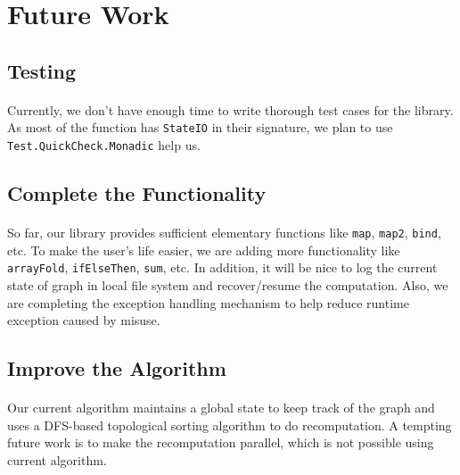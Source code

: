 \documentclass[a4paper, twocolumn]{article}
\newcommand{\code}{\texttt} %
\begin{document}
\section{Future Work}
\subsection{Testing}
\paragraph{} Currently, we don't have enough time to write thorough test cases for the library. As most of the function has \code{StateIO} in their signature, we plan to use \code{Test.QuickCheck.Monadic} help us.  

\subsection{Complete the Functionality}
\paragraph{} So far, our library provides sufficient elementary functions like \code{map}, \code{map2}, \code{bind}, etc. To make the user's life easier, we are adding more functionality like \code{arrayFold}, \code{ifElseThen}, \code{sum}, etc. In addition, it will be nice to log the current state of graph in local file system and recover/resume the computation. Also, we are completing the exception handling mechanism to help reduce runtime exception caused by misuse. 

\subsection{Improve the Algorithm}
\paragraph{} Our current algorithm maintains a global state to keep track of the graph and uses a DFS-based topological sorting algorithm to do recomputation. A tempting future work is to make the recomputation parallel, which is not possible using current algorithm.




\end{document}

